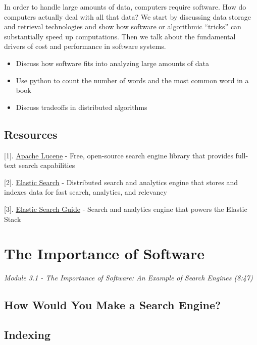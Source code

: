 \documentclass[
]{book}
\providecommand{\tightlist}{%
  \setlength{\itemsep}{0pt}\setlength{\parskip}{0pt}}
\begin{document}
In order to handle large amounts of data, computers require software. How do computers actually deal with all that data? We start by discussing data storage and retrieval technologies and show how software or algorithmic ``tricks'' can substantially speed up computations. Then we talk about the fundamental drivers of cost and performance in software systems.

\begin{itemize}
\tightlist
\item
  Discuss how software fits into analyzing large amounts of data
\item
  Use python to count the number of words and the most common word in a book
\item
  Discuss tradeoffs in distributed algorithms
\end{itemize}

\subsection{Resources}\label{resources-2}

{[}1{]}. \href{https://lucene.apache.org/}{Apache Lucene} - Free, open-source search engine library that provides full-text search capabilities

{[}2{]}. \href{https://www.elastic.co/}{Elastic Search} - Distributed search and analytics engine that stores and indexes data for fast search, analytics, and relevancy

{[}3{]}. \href{https://www.elastic.co/guide/en/elasticsearch/reference/current/index.html}{Elastic Search Guide} - Search and analytics engine that powers the Elastic Stack

\section{The Importance of Software}\label{the-importance-of-software}

\emph{Module 3.1 - The Importance of Software: An Example of Search Engines (8:47)}

\subsection{How Would You Make a Search Engine?}\label{how-would-you-make-a-search-engine}

\subsection{Indexing}\label{indexing}
\end{document}
